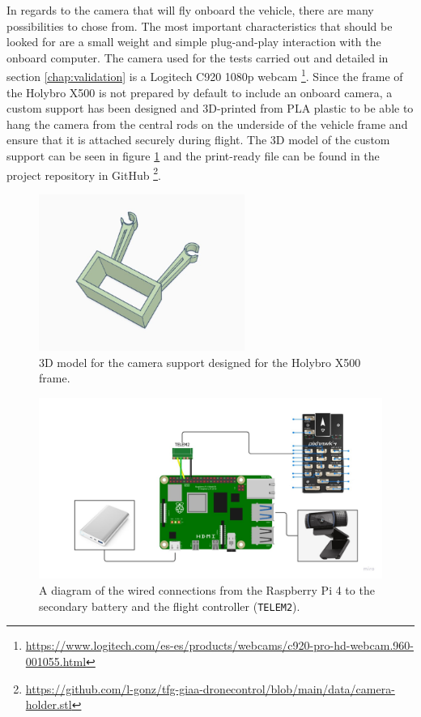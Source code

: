 In regards to the camera that will fly onboard the vehicle, there are many possibilities to chose from.
The most important characteristics that should be looked for are a small weight and simple plug-and-play interaction with the onboard computer.
The camera used for the tests carried out and detailed in section \ref{chap:validation} is a Logitech C920 1080p webcam \footnote{\url{https://www.logitech.com/es-es/products/webcams/c920-pro-hd-webcam.960-001055.html}}.
Since the frame of the Holybro X500 is not prepared by default to include an onboard camera,
a custom support has been designed and 3D-printed from PLA plastic to be able to hang the camera from the central rods on the underside of the vehicle frame and ensure that it is attached securely during flight.
The 3D model of the custom support can be seen in figure \ref{fig:camera-holder-3d} and the print-ready file can be found in the project repository in GitHub \footnote{\url{https://github.com/l-gonz/tfg-giaa-dronecontrol/blob/main/data/camera-holder.stl}}.

\begin{figure}
  \centering
  \includegraphics[width=0.6\textwidth, keepaspectratio]{img/cam-holder.jpg}
  \caption{3D model for the camera support designed for the Holybro X500 frame.}
  \label{fig:camera-holder-3d}
\end{figure}


\begin{figure}
  \centering
  \includegraphics[width=\textwidth,keepaspectratio]{img/wiring-diagram.jpg}
  \caption{A diagram of the wired connections from the Raspberry Pi 4 to the secondary battery and the flight controller (\texttt{TELEM2}).}
  \label{fig:wiring}
\end{figure}


